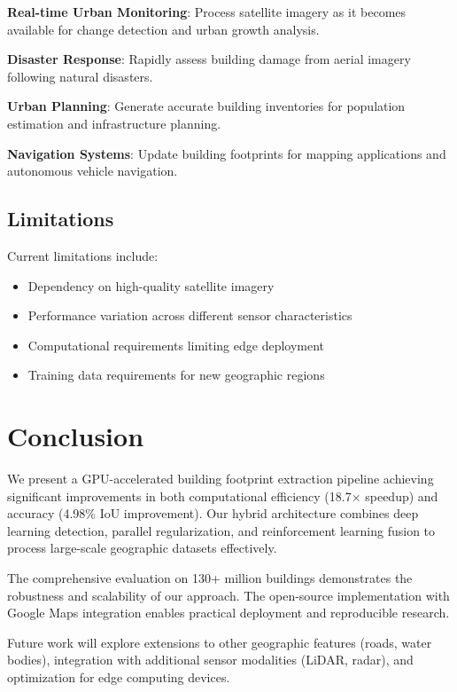 \documentclass{article}
\begin{document}
\textbf{Real-time Urban Monitoring}: Process satellite imagery as it becomes available for change detection and urban growth analysis.

\textbf{Disaster Response}: Rapidly assess building damage from aerial imagery following natural disasters.

\textbf{Urban Planning}: Generate accurate building inventories for population estimation and infrastructure planning.

\textbf{Navigation Systems}: Update building footprints for mapping applications and autonomous vehicle navigation.

\subsection{Limitations}

Current limitations include:

\begin{itemize}
\item Dependency on high-quality satellite imagery
\item Performance variation across different sensor characteristics  
\item Computational requirements limiting edge deployment
\item Training data requirements for new geographic regions
\end{itemize}

\section{Conclusion}

We present a GPU-accelerated building footprint extraction pipeline achieving significant improvements in both computational efficiency (18.7× speedup) and accuracy (4.98\% IoU improvement). Our hybrid architecture combines deep learning detection, parallel regularization, and reinforcement learning fusion to process large-scale geographic datasets effectively.

The comprehensive evaluation on 130+ million buildings demonstrates the robustness and scalability of our approach. The open-source implementation with Google Maps integration enables practical deployment and reproducible research.

Future work will explore extensions to other geographic features (roads, water bodies), integration with additional sensor modalities (LiDAR, radar), and optimization for edge computing devices.
\end{document}
